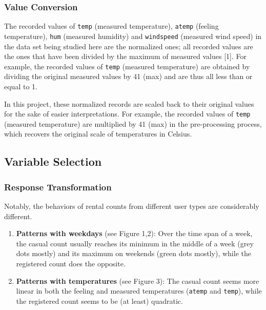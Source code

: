 \documentclass[
  twocolumn]{article}
\begin{document}
\hypertarget{value-conversion}{%
\subsubsection{Value Conversion}\label{value-conversion}}

The recorded values of \texttt{temp} (measured temperature),
\texttt{atemp} (feeling temperature), \texttt{hum} (measured humidity)
and \texttt{windspeed} (measured wind speed) in the data set being
studied here are the normalized ones; all recorded values are the ones
that have been divided by the maximum of measured values {[}1{]}. For
example, the recorded values of \texttt{temp} (measured temperature) are
obtained by dividing the original measured values by 41 (max) and are
thus all less than or equal to 1.

In this project, these normalized records are scaled back to their
original values for the sake of easier interpretations. For example, the
recorded values of \texttt{temp} (measured temperature) are multiplied
by 41 (max) in the pre-processing process, which recovers the original
scale of temperatures in Celsius.

\hypertarget{variable-selection}{%
\subsection{Variable Selection}\label{variable-selection}}

\hypertarget{response-transformation}{%
\subsubsection{Response Transformation}\label{response-transformation}}

Notably, the behaviors of rental counts from different user types are
considerably different.

\begin{enumerate}
\def\labelenumi{\arabic{enumi}.}
\item
  \textbf{Patterns with weekdays} (see Figure 1,2): Over the time span
  of a week, the casual count usually reaches its minimum in the middle
  of a week (grey dots mostly) and its maximum on weekends (green dots
  mostly), while the registered count does the opposite.
\item
  \textbf{Patterns with temperatures} (see Figure 3): The casual count
  seems more linear in both the feeling and measured temperatures
  (\texttt{atemp} and \texttt{temp}), while the registered count seems
  to be (at least) quadratic.
\end{enumerate}
\end{document}
